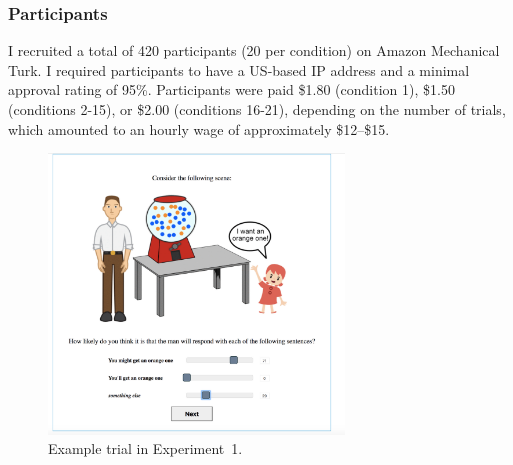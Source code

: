 \subsubsection{Participants}
I recruited a total of 420 participants 
(20 per condition) on Amazon Mechanical Turk. 
I required participants to have a US-based IP address and a minimal approval rating of 95\%.
Participants were paid \$1.80 (condition 1), \$1.50 (conditions 2-15),
or \$2.00 (conditions 16-21),
depending on the number of trials,
which amounted to an hourly wage of approximately \$12--\$15. 


\begin{figure}[th!]
\center
\includegraphics[width=0.7\textwidth, trim={0 0 1.1cm 0},clip]{plots/fig-2-pre-test-example-trial.jpg} 
\caption{Example trial in Experiment~1. \label{fig:norming-trial} }
\end{figure}

